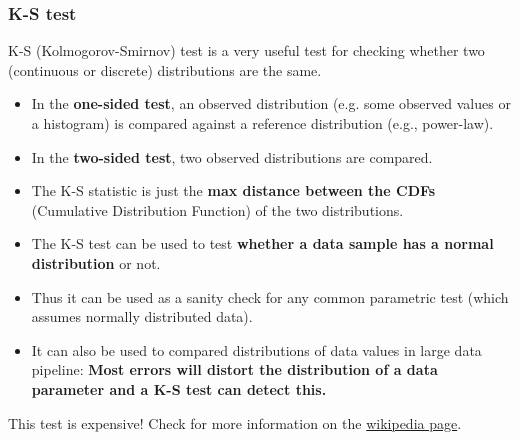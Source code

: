 \subsubsection{K-S test}
K-S (Kolmogorov-Smirnov) test is a very useful test for checking whether two (continuous or discrete) distributions are the same. 
\begin{itemize}
 \item In the {\bf one-sided test}, an observed distribution (e.g. some observed values or a histogram) is compared against a reference distribution (e.g., power-law).
 \item In the {\bf two-sided test}, two observed distributions are compared.
 \item The K-S statistic is just the {\bf max distance between the CDFs} (Cumulative Distribution Function) of the two distributions.
 \item The K-S test can be used to test {\bf whether a data sample has  a normal distribution} or not.
 \item Thus it can be used as a sanity check for any common parametric test (which assumes normally distributed data).
 \item It can also be used to compared distributions of data values in large data pipeline: {\bf Most errors will distort the distribution of a data parameter and a K-S test can detect this.}
\end{itemize}
This test is expensive! Check for more information on the \href{https://en.wikipedia.org/wiki/Kolmogorov?Smirnov_test}{wikipedia page}.

